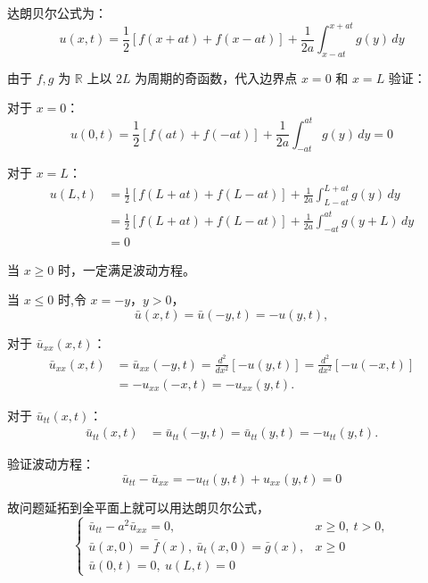 \documentclass[12pt,a4paper]{article}
\numberwithin{subsection}{section}
\numberwithin{subsubsection}{subsection}
\theoremstyle{plain}
\theoremstyle{definition}
\theoremstyle{remark}
\begin{document}
达朗贝尔公式为：
\begin{equation}
	u(x,t) = \frac{1}{2} \left[ f(x + at) + f(x - at) \right] + \frac{1}{2a} \int_{x - at}^{x + at} g(y) \, dy
\end{equation}

由于 \(f, g\) 为 \(\mathbb{R}\) 上以 \(2L\) 为周期的奇函数，代入边界点 \(x = 0\) 和 \(x = L\) 验证：

对于 \(x = 0\)：
\begin{equation}
	u(0, t) = \frac{1}{2} \left[ f(at) + f(-at) \right] + \frac{1}{2a} \int_{-at}^{at} g(y) \, dy = 0
\end{equation}

对于 \(x = L\)：
\begin{equation}
	\begin{aligned}
		u(L, t) &= \frac{1}{2}[f(L + at) + f(L - at)] + \frac{1}{2a} \int_{L - at}^{L + at} g(y) \, dy \\
		&= \frac{1}{2}[f(L + at) + f(L - at)] + \frac{1}{2a} \int_{-at}^{at} g(y + L) \, dy \\
		&= 0
	\end{aligned}
\end{equation}

	当 \(x \geq 0\) 时，一定满足波动方程。

当 \(x \leq 0\) 时,令 \(x = -y\)，\(y > 0\)，
\[
\bar{u}(x, t) = \bar{u}(-y, t) = -u(y, t),
\]

对于 \(\bar{u}_{xx}(x, t)\)：
\[
\begin{aligned}
	\bar{u}_{xx}(x, t) &= \bar{u}_{xx}(-y, t) = \frac{d^2}{dx^2} [-u(y, t)] = \frac{d^2}{dx^2} [-u(-x, t)] \\
	&= -u_{xx}(-x, t) = -u_{xx}(y, t).
\end{aligned}
\]

对于 \(\bar{u}_{tt}(x, t)\)：
\[
\begin{aligned}
	\bar{u}_{tt}(x, t) &= \bar{u}_{tt}(-y, t) = \bar{u}_{tt}(y, t) = -u_{tt}(y, t).
\end{aligned}
\]

验证波动方程：
\[
\bar{u}_{tt} - \bar{u}_{xx} = -u_{tt}(y, t) + u_{xx}(y, t) = 0
\]

故问题延拓到全平面上就可以用达朗贝尔公式，
\begin{equation*}
	\begin{cases}
		\bar{u}_{tt} - a^2 \bar{u}_{xx} = 0, & x \geq  0 , \ t > 0, \\
		\bar{u}(x, 0) = \bar{f}(x), \ \bar{u}_t(x, 0) = \bar{g}(x), & x \geq  0 \\
		\bar{u}(0, t) = 0, \ u(L, t) = 0
	\end{cases}
\end{equation*}
\end{document}
